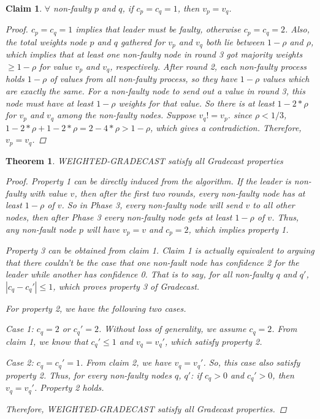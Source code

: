 \documentclass[conference]{IEEEtran}
\newtheorem{t1}{Theorem}
\newtheorem{claim*}{Claim}
\begin{document}
\begin{claim*}
$\forall$ non-faulty $p$ and $q$, if $c_p = c_q = 1$, then $v_p = v_q$. 
\begin{proof}
$c_p = c_q = 1$ implies that leader must be faulty, otherwise $c_p = c_q = 2$. Also, the total weights node $p$ and $q$ gathered for $v_p$ and $v_q$ both lie between $1 - \rho$ and $\rho$, which implies that at least one non-faulty node in round 3 got majority weights $\geq 1 - \rho$ for value $v_p$ and $v_q$, respectively. After round 2,  each non-faulty process holds $1 - \rho$ of values from all non-faulty process, so they have $1 - \rho$ values which are exactly the same. For a non-faulty node to send out a value in round 3, this node must have at least $1 - \rho$ weights for that value. So there is at least $1 - 2*\rho$ for $v_p$ and $v_q$ among the non-faulty nodes. Suppose $v_q != v_p$. since $\rho < 1/3$, $1 - 2*\rho + 1 - 2*\rho = 2 - 4*\rho > 1 - \rho$, which gives a contradiction. Therefore, $v_p = v_q$.
\end{proof}
\end{claim*}

\begin{t1}
WEIGHTED-GRADECAST satisfy all Gradecast properties
\begin{proof}
Property 1 can be directly induced from the algorithm. If the leader is non-faulty with value $v$,  then after the first two rounds, every non-faulty node has at least $1 - \rho$ of $v$. So in Phase 3, every non-faulty node will send $v$ to all other nodes, then after Phase 3 every non-faulty node gets at least $1 - \rho$ of $v$. Thus, any non-fault node $p$ will have $v_p = v$ and $c_p = 2$, which implies property 1. 
 
Property 3 can be obtained from claim 1. Claim 1 is actually equivalent to arguing that there couldn't be the case that one non-fault node has confidence 2 for the leader while another has confidence 0. That is to say, for all non-faulty $q$ and $q'$, $|c_q - c_q'| \leq 1$, which proves property 3 of Gradecast.

For property 2, we have the following two cases. 

Case 1: $c_q = 2$ or $c_q' = 2$. Without loss of generality,  we assume $c_q = 2$. From claim 1, we know that $c_q' \leq 1$ and $v_q = v_q'$,  which satisfy property 2.

Case 2: $c_q = c_q' = 1$. From claim 2, we have $v_q = v_q'$. So, this case also satisfy property 2. 
Thus, for every non-faulty nodes $q$, $q'$: if $c_q > 0$ and $c_q' > 0$, then $v_q = v_q'$. Property 2 holds.

Therefore, \textit{WEIGHTED-GRADECAST} satisfy all Gradecast properties. 
\end{proof}
\end{t1}
\end{document}
